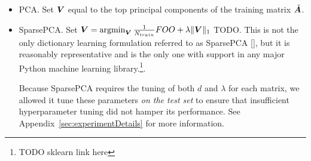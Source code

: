 \begin{itemize}\itemsep0em
    \item PCA. Set $\bm{V}$ equal to the top principal components of the training matrix $\tilde{\bm{A}}$.
    \item SparsePCA. Set $\bm{V} = \operatorname*{argmin}_{\bm{V}} \frac{1}{N_{train}} FOO + \lambda \lVert\bm{V}\rVert_1$ TODO. This is not the only dictionary learning formulation referred to as SparsePCA [], but it is reasonably representative and is the only one with support in any major Python machine learning library.\footnote{TODO sklearn link here}.

    Because SparsePCA requires the tuning of both $d$ and $\lambda$ for each matrix, we allowed it tune these parameters \textit{on the test set} to ensure that insufficient hyperparameter tuning did not hamper its performance. See Appendix~\ref{sec:experimentDetails} for more information.


\end{itemize}
